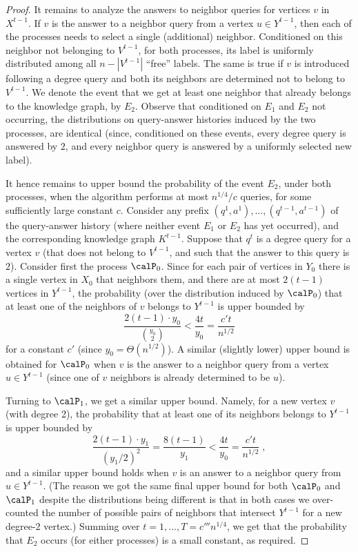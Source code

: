 \begin{proof}
It remains to analyze the answers to neighbor queries for vertices $v$ in $X^{t-1}$.
If $v$ is the answer to a neighbor query from a vertex $u \in Y^{t-1}$, then each of the processes needs to select a single (additional) neighbor. Conditioned on this neighbor not belonging to $V^{t-1}$, for both processes, its label is uniformly distributed among all $n-|V^{t-1}|$ ``free'' labels. The same is true if $v$ is introduced following a degree query and both its neighbors are determined not to belong to $V^{t-1}$. We denote the event that we get at least one neighbor that already belongs to the knowledge graph, by $E_2$. Observe that conditioned on $E_1$ and $E_2$ not occurring,  the distributions on query-answer histories induced by the two processes, are identical (since, conditioned on these events, every degree query is answered by $2$, and every neighbor query is answered by a uniformly selected new label).

It hence remains to upper bound the probability of the event $E_2$, under both processes, when the algorithm performs at most $n^{1/4}/c$ queries, for some sufficiently large constant $c$. Consider any prefix $(q^1,a^1),\dots,(q^{t-1},a^{t-1})$ of the query-answer history (where neither event $E_1$ or $E_2$ has yet occurred), and the corresponding knowledge graph $K^{t-1}$.
Suppose that $q^t$ is a degree query for a vertex $v$ (that does not belong to $V^{t-1}$, and such that the answer to this query is $2$). Consider first the process $\calP_0$. Since for each pair of vertices in $Y_0$ there is a single vertex in $X_0$ that neighbors them, and there are at most $2(t-1)$ vertices in $Y^{t-1}$, the probability (over the distribution induced by $\calP_0$) that at least one of the neighbors of $v$ belongs to $Y^{t-1}$ is upper bounded by
$$\frac{2(t-1)\cdot y_0}{{y_0\choose 2}} < \frac{4t}{y_0} = \frac{c' t}{n^{1/2}}$$
 for a constant $c'$ (since $y_0 = \Theta(n^{1/2})$). A similar (slightly lower) upper bound is obtained for $\calP_0$ when $v$ is the answer to a neighbor query from a vertex $u \in Y^{t-1}$ (since one of $v$ neighbors is already determined to be $u$).

Turning to $\calP_1$, we get a similar upper bound. Namely, for a new vertex $v$ (with degree 2), the probability that at least one of its neighbors belongs to $Y^{t-1}$ is upper bounded by
$$\frac{2(t-1)\cdot y_1}{(y_1/2)^2} = \frac{8(t-1)}{y_1} <\frac{4t}{y_0}= \frac{c' t}{n^{1/2}}\;,$$
 and a similar upper bound holds when $v$ is an answer to a neighbor query from $u\in Y^{t-1}$.
 (The reason we got the same final upper bound for both $\calP_0$ and $\calP_1$ despite the distributions being different is that in both cases we over-counted the number of possible pairs of neighbors that intersect $Y^{t-1}$ for a new degree-2 vertex.)
  Summing over $t=1,\dots,T= c'''n^{1/4}$, we get that the probability that $E_2$ occurs (for either processes) is a small constant, as required.
\end{proof}


